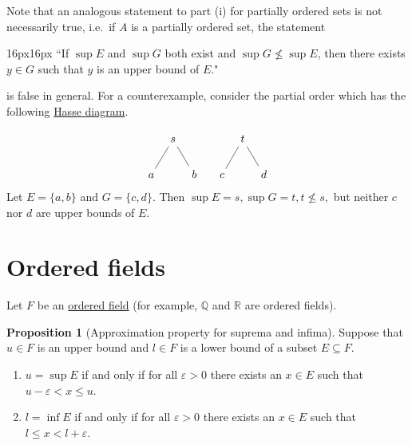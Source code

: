 \documentclass[12pt]{article}
\theoremstyle{definition}
\newtheorem{proposition}[definition]{Proposition}
\begin{document}
Note that an analogous statement to part (i) for partially ordered sets is not necessarily true, i.e.\ if \( A \) is a partially ordered set, the statement

\vspace{6px}
\begin{adjustwidth}{16px}{16px}
    ``If \( \sup E \) and \( \sup G \) both exist and \( \sup G \not\leq \sup E \), then there exists \( y \in G \) such that \( y \) is an upper bound of \( E \)."
\end{adjustwidth}
\vspace{6px}

\noindent is false in general. For a counterexample, consider the partial order which has the following \href{https://en.wikipedia.org/wiki/Hasse_diagram}{Hasse diagram}.

\[
\begin{tikzcd}[column sep = tiny]
    & s & & & & t & \\
    a \arrow[ru, no head] & & b \arrow[lu, no head] & & c \arrow[ru, no head] & & d \arrow[lu, no head]
\end{tikzcd}
\]
Let \( E = \{ a, b \} \) and \( G = \{ c, d \} \). Then \( \sup E = s, \sup G = t, t \not\leq s, \) but neither \( c \) nor \( d \) are upper bounds of \( E \).


\section{Ordered fields}
\label{sec:ordered_fields}

Let \( F \) be an \href{https://en.wikipedia.org/wiki/Ordered_field}{ordered field} (for example, \( \mathbb{Q} \) and \( \mathbb{R} \) are ordered fields).

\begin{proposition}[Approximation property for suprema and infima]
\label{prop:approximation_property}
    Suppose that \( u \in F \) is an upper bound and \( l \in F \) is a lower bound of a subset \( E \subseteq F \).

    \begin{enumerate}[label = (\roman*)]
        \item \( u = \sup E \) if and only if for all \( \varepsilon > 0 \) there exists an \( x \in E \) such that \( u - \varepsilon < x \leq u \).

        \item \( l = \inf E \) if and only if for all \( \varepsilon > 0 \) there exists an \( x \in E \) such that \( l \leq x < l + \varepsilon \).
    \end{enumerate}
\end{proposition}
\end{document}
